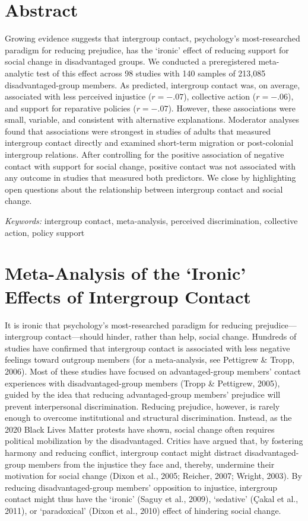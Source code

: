 \documentclass[12pt, letterpaper]{article}
\begin{document}
\section{Abstract}

\noindent Growing evidence suggests that intergroup contact, psychology's
most-researched paradigm for reducing prejudice, has the `ironic' effect
of reducing support for social change in disadvantaged groups. We
conducted a preregistered meta-analytic test of this effect across 98
studies with 140 samples of 213,085 disadvantaged-group members. As
predicted, intergroup contact was, on average, associated with less
perceived injustice (\(r = -.07\)), collective action (\(r = -.06\)),
and support for reparative policies (\(r = -.07\)). However, these
associations were small, variable, and consistent with alternative
explanations. Moderator analyses found that associations were strongest
in studies of adults that measured intergroup contact directly and
examined short-term migration or post-colonial intergroup relations.
After controlling for the positive association of negative contact with
support for social change, positive contact was not associated with any
outcome in studies that measured both predictors. We close by
highlighting open questions about the relationship between intergroup
contact and social change.

\textit{Keywords:} intergroup contact, meta-analysis, perceived discrimination, collective
action, policy support

\newpage

\section{Meta-Analysis of the `Ironic' Effects of Intergroup Contact}

It is ironic that psychology's most-researched paradigm for reducing
prejudice---intergroup contact---should hinder, rather than help, social
change. Hundreds of studies have confirmed that intergroup contact is
associated with less negative feelings toward outgroup members (for a
meta-analysis, see Pettigrew \& Tropp, 2006). Most of these studies have
focused on advantaged-group members' contact experiences with
disadvantaged-group members (Tropp \& Pettigrew, 2005), guided by the
idea that reducing advantaged-group members' prejudice will prevent
interpersonal discrimination. Reducing prejudice, however, is rarely
enough to overcome institutional and structural discrimination. Instead,
as the 2020 Black Lives Matter protests have shown, social change often
requires political mobilization by the disadvantaged. Critics have
argued that, by fostering harmony and reducing conflict, intergroup
contact might distract disadvantaged-group members from the injustice
they face and, thereby, undermine their motivation for social change
(Dixon et al., 2005; Reicher, 2007; Wright, 2003). By reducing
disadvantaged-group members' opposition to injustice, intergroup contact
might thus have the `ironic' (Saguy et al., 2009), `sedative' (Çakal et
al., 2011), or `paradoxical' (Dixon et al., 2010) effect of hindering
social change.
\end{document}
